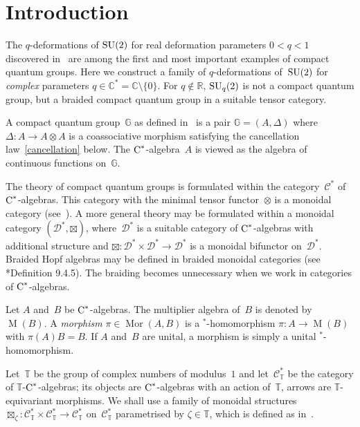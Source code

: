 \documentclass[a4paper]{amsart}
\numberwithin{equation}{section}
\theoremstyle{definition}
\theoremstyle{remark}
\begin{document}
\section{Introduction}
The $q${\nobreakdash}-deformations of ${\textup{SU}}(2)$ for real deformation parameters
$0<q<1$ discovered in~\cite{Woronowicz:Twisted_SU2} are among the
first and most important examples of compact quantum groups.  Here we
construct a family of $q${\nobreakdash}-deformations of~${\textup{SU}}(2)$ for
\emph{complex} parameters $q\in{{\mathbb C}}^*={{\mathbb C}}\setminus\{0\}$.
For $q\notin \mathbb{R}$, ${\textup{SU}}_q(2)$ is not a compact quantum group,
but a braided compact quantum group in a suitable tensor category.

A compact quantum group~$\mathbb{G}$ as defined
in~\cite{Woronowicz:CQG} is a pair $\mathbb{G} = (A,\Delta)$ where
$\Delta\colon A\rightarrow A\otimes A$ is a coassociative morphism
satisfying the cancellation law~\eqref{cancellation} below.  The
\({\textup{C}^*}\){\nobreakdash}-algebra~$A$ is viewed as the algebra of continuous
functions on~${\mathbb{G}}$.

The theory of compact quantum groups is formulated within the
category~$\mathcal{C}^*$ of ${\textup{C}^*}$-algebras.  This category with the
minimal tensor functor~$\otimes$ is a monoidal category
(see~\cite{MacLane:Categories}).  A more general theory may be
formulated within a monoidal category $(\mathcal{D}^*,{\boxtimes})$,
where~$\mathcal{D}^*$ is a suitable category of ${\textup{C}^*}${\nobreakdash}-algebras
with additional structure and ${\boxtimes}\colon
\mathcal{D}^*\times\mathcal{D}^*\rightarrow\mathcal{D}^*$ is a
monoidal bifunctor on~$\mathcal{D}^*$.  Braided Hopf algebras may be
defined in braided monoidal categories (see
\cite{Majid:Quantum_grp}*{Definition 9.4.5}).  The braiding becomes
unnecessary when we work in categories of \({\textup{C}^*}\){\nobreakdash}-algebras.

Let $A$ and~$B$ be ${\textup{C}^*}${\nobreakdash}-algebras.  The multiplier algebra
of~$B$ is denoted by~${\operatorname{M}}(B)$.  A \emph{morphism} $\pi\in{\operatorname{Mor}}(A,B)$
is a $^*${\nobreakdash}-homomorphism $\pi\colon A\rightarrow{\operatorname{M}}(B)$ with
$\pi(A)B = B$.  If \(A\) and~\(B\) are unital, a morphism is simply
a unital $^*${\nobreakdash}-homomorphism.

Let~$\mathbb{T}$ be the group of complex numbers of modulus~$1$ and
let~$\mathcal{C}^*_{\mathbb{T}}$ be the category of
$\mathbb{T}${\nobreakdash}-${\textup{C}^*}$-algebras; its objects are ${\textup{C}^*}${\nobreakdash}-algebras
with an action of~$\mathbb{T}$, arrows are
\(\mathbb{T}\){\nobreakdash}-equivariant morphisms.  We shall use a family of
monoidal structures ${\boxtimes}_{\zeta}\colon
\mathcal{C}^*_{\mathbb{T}}\times
\mathcal{C}^*_{\mathbb{T}}\rightarrow \mathcal{C}^*_{\mathbb{T}}$
on~$\mathcal{C}^*_{\mathbb{T}}$ parametrised by
$\zeta\in\mathbb{T}$, which is defined as
in~\cite{Meyer-Roy-Woronowicz:Twisted_tensor}.
\end{document}
